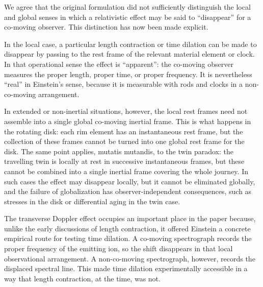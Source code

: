 \documentclass[submitted,11pt]{article}
\begin{document}
\begin{reply}
We agree that the original formulation did not sufficiently distinguish the local and global senses in which a relativistic effect may be said to “disappear” for a co-moving observer. This distinction has now been made explicit.

In the local case, a particular length contraction or time dilation can be made to disappear by passing to the rest frame of the relevant material element or clock. In that operational sense the effect is “apparent”: the co-moving observer measures the proper length, proper time, or proper frequency. It is nevertheless “real” in Einstein’s sense, because it is measurable with rods and clocks in a non-co-moving arrangement.

In extended or non-inertial situations, however, the local rest frames need not assemble into a single global co-moving inertial frame. This is what happens in the rotating disk: each rim element has an instantaneous rest frame, but the collection of these frames cannot be turned into one global rest frame for the disk. The same point applies, mutatis mutandis, to the twin paradox: the travelling twin is locally at rest in successive instantaneous frames, but these cannot be combined into a single inertial frame covering the whole journey. In such cases the effect may disappear locally, but it cannot be eliminated globally, and the failure of globalization has observer-independent consequences, such as stresses in the disk or differential aging in the twin case.

The transverse Doppler effect occupies an important place in the paper because, unlike the early discussions of length contraction, it offered Einstein a concrete empirical route for testing time dilation. A co-moving spectrograph records the proper frequency of the emitting ion, so the shift disappears in that local observational arrangement. A non-co-moving spectrograph, however, records the displaced spectral line. This made time dilation experimentally accessible in a way that length contraction, at the time, was not. 



\end{reply}
\end{document}
